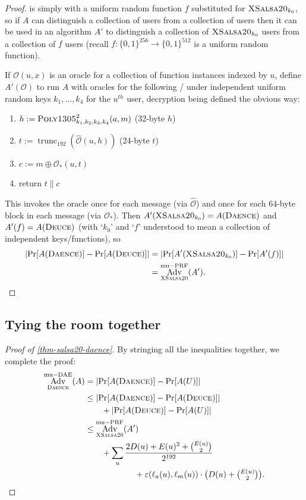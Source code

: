 \documentclass[draft]{article}
\DeclareRobustCommand{\operatorsc}[1]{{%
  \ifmmode\let\next=\operatorname\else\let\next=\relax\fi\next{\textsc{#1}}}}
\def\XSalsa#1/{\operatorsc{XSalsa#1}}
\def\Poly#1/{\operatorsc{Poly#1}}
\def\Daence/{\operatorsc{Daence}}
\def\Deuce/{\operatorsc{Deuce}}
\DeclareMathOperator{\Adv}{Adv}
\DeclareMathOperator{\muDAE}{mu-DAE}
\DeclareMathOperator{\muPRF}{mu-PRF}
\DeclareMathOperator{\trunc}{trunc}
\newcommand{\concat}{\mathbin\|}
\newcommand{\collisionbound}{\varepsilon}
\begin{document}
\begin{proof}
  \Deuce/ is simply \Daence/ with a uniform random function $f$
   substituted for $\XSalsa20/_{k_0}$, so if $A$ can distinguish a
   collection of \Daence/ users from a collection of \Deuce/ users then
   it can be used in an algorithm $A'$ to distinguish a collection of
   $\XSalsa20/_{k_0}$ users from a collection of $f$ users (recall
   $f\colon \{0,1\}^{256} \to \{0,1\}^{512}$ is a
   uniform random function).

  If $\mathcal O(u,x)$ is an oracle for a collection of function
   instances indexed by $u$, define $A'(\mathcal O)$ to run $A$ with
   oracles for the following \DAE/ under independent uniform random keys
   $k_1,\dotsc,k_4$ for the $u^{\mathit{th}}$ user, decryption being
   defined the obvious way:
%
  \begin{enumerate}
    \item $h := \Poly1305/^2_{k_1,k_2,k_3,k_4}(a, m)$
      \hfill (32-byte $h$)
    \item $t := \trunc_{192}(\hat{\mathcal O}(u, h))$
      \hfill (24-byte $t$)
    \item $c := m \oplus \mathcal O_*(u, t)$
    \item return $t \concat c$
  \end{enumerate}
%
  This invokes the oracle once for each message
   (via $\hat{\mathcal O}$)
   and once for each 64-byte block in each message
   (via $\mathcal O_*$).
  Then $A'(\XSalsa20/_{k_0}) = A(\Daence/)$ and $A'(f) = A(\Deuce/)$
   (with `$k_0$' and `$f$' understood to mean a collection of
   independent keys/functions), so
  \begin{align*}
    \lvert\Pr[A(\Daence/)] - \Pr[A(\Deuce/)]\rvert
    &= \lvert\Pr[A'(\XSalsa20/_{k_0})] - \Pr[A'(f)]\rvert \\
    &= \Adv^{\muPRF}_{\XSalsa20/}(A').
    \qedhere
  \end{align*}
\end{proof}

\subsection{Tying the room together}

\begin{proof}[Proof of \autoref{thm-salsa20-daence}]
  By stringing all the inequalities together, we complete the proof:
%
  \begin{align*}
    \Adv^{\muDAE}_{\Daence/}(A)
    &= \lvert\Pr[A(\Daence/)] - \Pr[A(U)]\rvert \\
    &\leq \lvert\Pr[A(\Daence/)] - \Pr[A(\Deuce/)]\rvert \\
    &\qquad + \lvert\Pr[A(\Deuce/)] - \Pr[A(U)]\rvert \\
    &\leq \Adv^{\muPRF}_{\XSalsa20/}(A') \\
    &\qquad
       + \sum_u \frac{2 D(u) + E(u)^2 + \binom{E(u)}{2}}
                     {2^{192}} \\
    &\qquad\qquad\qquad
           + \collisionbound(\ell_a(u), \ell_m(u))
             \cdot
             {\textstyle\bigl(D(u) + \binom{E(u)}{2}\bigr)}.
    \qedhere
  \end{align*}
\end{proof}
\end{document}
